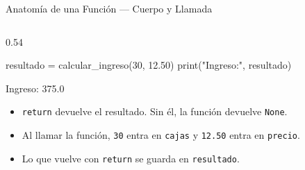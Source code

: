 \documentclass[aspectratio=169, 11pt]{beamer}
\begin{document}
\begin{frame}[fragile,shrink=28]{Anatomía de una Función --- Cuerpo y Llamada}
\begin{columns}[T]
\begin{column}{0.54\textwidth}
\begin{pyblock}
resultado = calcular_ingreso(30, 12.50)
print("Ingreso:", resultado)
      \end{pyblock}
      \vspace{-2pt}
      \begin{outputblock}
Ingreso: 375.0
      \end{outputblock}

      \vspace{2pt}
      {\scriptsize\color{textMuted}
      \begin{itemize}\setlength{\itemsep}{2pt}
        \item[{\color{arcaRed}\scriptsize\faArrowRight}]
          \texttt{return} devuelve el resultado.
          Sin él, la función devuelve \texttt{None}.
        \item[{\color{arcaRed}\scriptsize\faArrowRight}]
          Al llamar la función, \texttt{30} entra en
          \texttt{cajas} y \texttt{12.50} entra en \texttt{precio}.
        \item[{\color{arcaRed}\scriptsize\faArrowRight}]
          Lo que vuelve con \texttt{return} se guarda
          en \texttt{resultado}.
      \end{itemize}
      }
    \end{column}
  \end{columns}
\end{frame}
\end{document}
